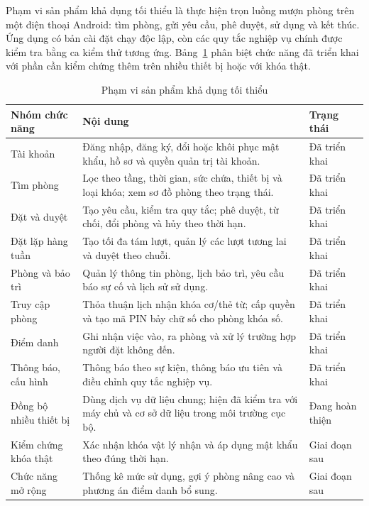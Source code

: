 Phạm vi sản phẩm khả dụng tối thiểu là thực hiện trọn luồng mượn phòng trên một điện thoại Android: tìm phòng, gửi yêu cầu, phê duyệt, sử dụng và kết thúc. Ứng dụng có bản cài đặt chạy độc lập, còn các quy tắc nghiệp vụ chính được kiểm tra bằng ca kiểm thử tương ứng. Bảng~\ref{tab:mvp} phân biệt chức năng đã triển khai với phần cần kiểm chứng thêm trên nhiều thiết bị hoặc với khóa thật.

\begin{table}[H]
\centering
\caption{Phạm vi sản phẩm khả dụng tối thiểu}
\label{tab:mvp}
\small
\begin{tabularx}{\textwidth}{>{\raggedright\arraybackslash}p{3.4cm} X >{\centering\arraybackslash}p{1.9cm}}
\toprule
\rowcolor{RoomHubLight}
\textbf{Nhóm chức năng} & \textbf{Nội dung} & \textbf{Trạng thái} \\
\midrule
Tài khoản & Đăng nhập, đăng ký, đổi hoặc khôi phục mật khẩu, hồ sơ và quyền quản trị tài khoản. & Đã triển khai \\
Tìm phòng & Lọc theo tầng, thời gian, sức chứa, thiết bị và loại khóa; xem sơ đồ phòng theo trạng thái. & Đã triển khai \\
Đặt và duyệt & Tạo yêu cầu, kiểm tra quy tắc; phê duyệt, từ chối, đổi phòng và hủy theo thời hạn. & Đã triển khai \\
Đặt lặp hàng tuần & Tạo tối đa tám lượt, quản lý các lượt tương lai và duyệt theo chuỗi. & Đã triển khai \\
Phòng và bảo trì & Quản lý thông tin phòng, lịch bảo trì, yêu cầu báo sự cố và lịch sử sử dụng. & Đã triển khai \\
Truy cập phòng & Thỏa thuận lịch nhận khóa cơ/thẻ từ; cấp quyền và tạo mã PIN bảy chữ số cho phòng khóa số. & Đã triển khai \\
Điểm danh & Ghi nhận việc vào, ra phòng và xử lý trường hợp người đặt không đến. & Đã triển khai \\
Thông báo, cấu hình & Thông báo theo sự kiện, thông báo ưu tiên và điều chỉnh quy tắc nghiệp vụ. & Đã triển khai \\
\midrule
Đồng bộ nhiều thiết bị & Dùng dịch vụ dữ liệu chung; hiện đã kiểm tra với máy chủ và cơ sở dữ liệu trong môi trường cục bộ. & Đang hoàn thiện \\
Kiểm chứng khóa thật & Xác nhận khóa vật lý nhận và áp dụng mật khẩu theo đúng thời hạn. & Giai đoạn sau \\
Chức năng mở rộng & Thống kê mức sử dụng, gợi ý phòng nâng cao và phương án điểm danh bổ sung. & Giai đoạn sau \\
\bottomrule
\end{tabularx}
\end{table}

